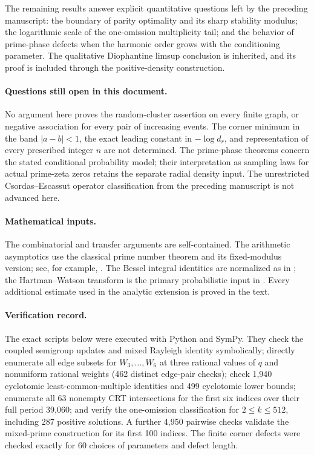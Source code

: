 \documentclass[11pt,a4paper]{article}
\theoremstyle{definition}
\theoremstyle{remark}\newtheorem{remark}[theorem]{Remark}
\begin{document}
The remaining results answer explicit quantitative questions left by the
preceding manuscript: the boundary of parity optimality and its sharp
stability modulus; the logarithmic scale of the one-omission multiplicity
tail; and the behavior of prime-phase defects when the harmonic order
grows with the conditioning parameter. The qualitative Diophantine
limsup conclusion is inherited, and its proof is included through the
positive-density construction.

\paragraph{Questions still open in this document.}
No argument here proves the random-cluster assertion on every finite
graph, or negative association for every pair of increasing events.
The corner minimum in the band $|a-b|<1$, the exact leading constant
in $-\log d_r$, and representation of every prescribed integer $n$
are not determined. The prime-phase theorems concern the stated
conditional probability model; their interpretation as sampling laws
for actual prime-zeta zeros retains the separate radial density input.
The unrestricted Csordas--Escassut operator classification from the
preceding manuscript is not advanced here.

\paragraph{Mathematical inputs.}
The combinatorial and transfer arguments are self-contained. The
arithmetic asymptotics use the classical prime number theorem and its
fixed-modulus version; see, for example, \cite[Theorem~4.12]{Kedlaya}.
The Bessel integral identities are normalized as in
\cite[\S10.32]{DLMF}; the Hartman--Watson transform is the primary
probabilistic input in \cite{Gerhold2011}. Every additional estimate
used in the analytic extension is proved in the text.

\paragraph{Verification record.}
The exact scripts below were executed with Python and SymPy. They check
the coupled semigroup updates and mixed Rayleigh identity symbolically;
directly enumerate all edge subsets for $W_3,\ldots,W_6$ at three rational
values of $q$ and nonuniform rational weights (462 distinct edge-pair
checks); check 1,940 cyclotomic least-common-multiple identities and 499
cyclotomic lower bounds; enumerate all 63 nonempty CRT intersections
for the first six indices over their full period 39,060; and verify the
one-omission classification for $2\le k\le512$, including 287 positive
solutions. A further 4,950 pairwise checks validate the mixed-prime
construction for its first 100 indices. The finite corner defects were
checked exactly for 60 choices of parameters and defect length.
\end{document}
